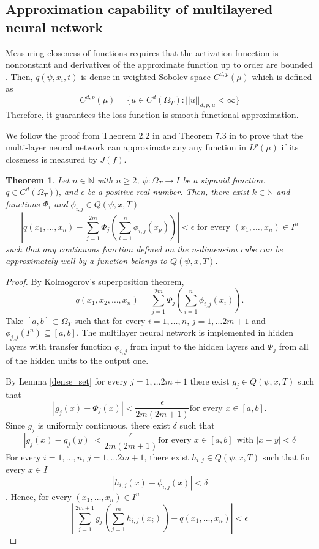 \documentclass{article}
\newtheorem{theorem}{Theorem}[section]
\begin{document}
\subsection{Approximation capability of multilayered neural network}


Measuring closeness of functions requires that the activation funcction is nonconstant and derivatives of the approximate function up to order are bounded \cite{hornik}. Then, $q(\psi,x_i,t)$ is dense in weighted Sobolev space $C^{d,p}(\mu)$ which is defined as \cite{hornik}
\begin{equation}
C^{d,p}(\mu) = \{ u \in C^{d}(\Omega_{T}): ||u||_{d,p,\mu} < \infty \}
\end{equation}
Therefore, it guarantees the loss function is smooth functional approximation.

We follow the proof from Theorem 2.2 in \cite{kurkova} and Theorem 7.3 in \cite{sirignano} to prove that the multi-layer neural network can approximate any any function in $L^{p}(\mu)$ if its closeness is measured by $J(f)$.

\begin{theorem}  \label{nn_proof}
	Let $n \in \mathbb{N}$ with $n \geq 2$, $\psi: \Omega_{T} \rightarrow \textit{I}$ be a sigmoid function. $q \in C^{d}(\Omega_{T}))$, and $\epsilon$ be a positive real number. Then, there exist $k \in \mathbb{N}$ and functions $\Phi_{i}$ and $\phi_{i,j} \in Q(\psi,x,T)$ 
	\begin{equation}
	\left|q(x_1,\dots,x_n)-\sum_{j=1}^{2m}\Phi_{j}\left(\sum_{i=1}^{n}\phi_{i,j}(x_p)\right)\right| < \epsilon \text{ for every } (x_1, \dots, x_n) \in I^{n}
	\end{equation}
	such that any continuous function defined on the n-dimension cube can be approximately well by a function belongs to $Q(\psi,x,T)$.
\end{theorem}
\begin{proof}
	By Kolmogorov's superposition theorem,
	\[q(x_1,x_2, \dots, x_n)=\sum_{j=1}^{2m}\Phi_{j}\left(\sum_{i=1}^{n}\phi_{i,j}(x_i)\right).\]
Take $[a,b] \subset \Omega_{T}$ such that for every $i=1,\dots,n$, $j=1, \dots 2m+1$ and $\phi_{j,j}(\textit{I}^{n})\subseteq [a,b]$.
The multilayer neural network is implemented in hidden layers with transfer function $\phi_{i,j}$ from input to the hidden layers and $\Phi_j$ from all of the hidden units to the output one.

By Lemma \ref{dense_set} for every $j = 1, \dots 2m+1$ there exist $g_{j} \in Q(\psi,x,T)$ such that
	\[\left|g_{j}(x)-\Phi_{j}(x)\right|<\frac{\epsilon}{2m(2m+1)} \text{for every } x \in [a,b].\]
	Since $g_{j}$ is uniformly continuous, there exist $\delta$ such that
	\[\left|g_{j}(x)-g_{j}(y)\right| <\frac{\epsilon}{2m(2m+1)} \text{for every } x \in [a,b]
	\ \ \text{with } \left|x-y\right|<\delta \]
	For every $i=1,\dots,n$, $j=1, \dots 2m+1$, there exist $h_{i,j} \in Q(\psi,x,T)$ such that for every $x \in \textit{I}$
	\[\left|h_{i,j}(x)-\phi_{i,j}(x)\right|<\delta \]. Hence, for every $(x_1, \dots , x_n)\in \textit{I}^{n}$
	\[	\left|\sum_{j=1}^{2m+1}g_{j}\left(\sum_{j=1}^{m}h_{i,j}(x_i)\right)-q(x_1,\dots,x_n)\right| < \epsilon\]
\end{proof}
\end{document}
